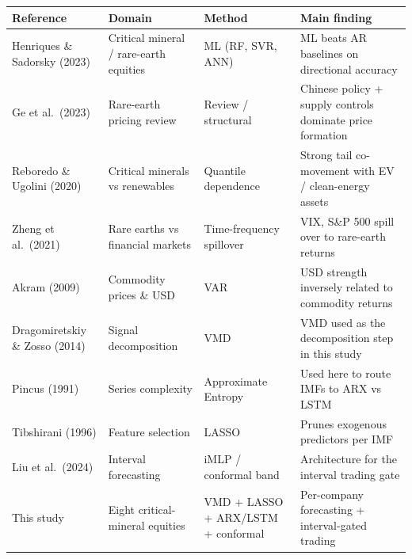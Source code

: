 \begin{tabular}{p{3.5cm}p{3.4cm}p{3.5cm}p{5cm}}
\toprule
Reference & Domain & Method & Main finding \\
\midrule
Henriques \& Sadorsky (2023) & Critical mineral / rare-earth equities & ML (RF, SVR, ANN) & ML beats AR baselines on directional accuracy \\
Ge et al.\ (2023) & Rare-earth pricing review & Review / structural & Chinese policy + supply controls dominate price formation \\
Reboredo \& Ugolini (2020) & Critical minerals vs renewables & Quantile dependence & Strong tail co-movement with EV / clean-energy assets \\
Zheng et al.\ (2021) & Rare earths vs financial markets & Time-frequency spillover & VIX, S\&P 500 spill over to rare-earth returns \\
Akram (2009) & Commodity prices \& USD & VAR & USD strength inversely related to commodity returns \\
Dragomiretskiy \& Zosso (2014) & Signal decomposition & VMD & VMD used as the decomposition step in this study \\
Pincus (1991) & Series complexity & Approximate Entropy & Used here to route IMFs to ARX vs LSTM \\
Tibshirani (1996) & Feature selection & LASSO & Prunes exogenous predictors per IMF \\
Liu et al.\ (2024) & Interval forecasting & iMLP / conformal band & Architecture for the interval trading gate \\
This study & Eight critical-mineral equities & VMD + LASSO + ARX/LSTM + conformal & Per-company forecasting + interval-gated trading \\
\bottomrule
\end{tabular}
